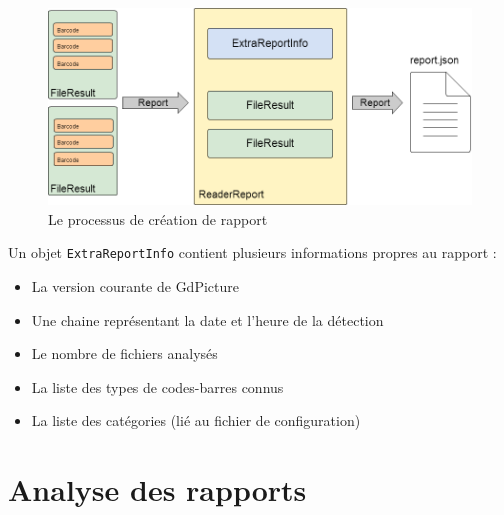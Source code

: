 \begin{figure}
\begin{center}
\includegraphics[scale=0.5]{images/projet1Rapport.png}
\caption{Le processus de création de rapport}
\end{center}
\end{figure}

Un objet \verb|ExtraReportInfo| contient plusieurs informations propres au rapport :
\begin{itemize}
\item La version courante de GdPicture
\item Une chaine représentant la date et l'heure de la détection
\item Le nombre de fichiers analysés
\item La liste des types de codes-barres connus
\item La liste des catégories (lié au fichier de configuration)
\end{itemize}

\section{Analyse des rapports}


